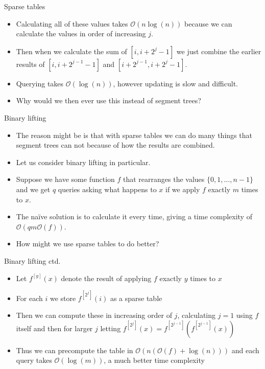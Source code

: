 \documentclass{beamer}
\begin{document}
\begin{frame}[plain]{Sparse tables}
    \begin{itemize}
        \item<1-> Calculating all of these values takes $\mathcal{O}(n\log(n))$ because we can calculate the values in order of increasing $j$.
        \item<2-> Then when we calculate the sum of $[i, i + 2^j - 1]$ we just combine the earlier results of $[i, i + 2^{j-1} - 1]$ and $[i + 2^{j-1}, i + 2^j - 1]$.
        \item<3-> Querying takes $\mathcal{O}(\log(n))$, however updating is slow and difficult.
        \item<4-> Why would we then ever use this instead of segment trees?
    \end{itemize}
\end{frame}

\begin{frame}[plain]{Binary lifting}
    \begin{itemize}
        \item<1-> The reason might be is that with sparse tables we can do many things that segment trees can not because of how the results are combined.
        \item<2-> Let us consider binary lifting in particular.
        \item<3-> Suppose we have some function $f$ that rearranges the values $\{0, 1, \dots, n - 1\}$ and we get $q$ queries asking what happens to $x$ if we apply $f$ exactly $m$ times to $x$.
        \item<4-> The naïve solution is to calculate it every time, giving a time complexity of $\mathcal{O}(qm\mathcal{O}(f))$.
        \item<5-> How might we use sparse tables to do better?
    \end{itemize}
\end{frame}

\begin{frame}[plain]{Binary lifting ctd.}
    \begin{itemize}
        \item<1-> Let $f^{[y]}(x)$ denote the result of applying $f$ exactly $y$ times to $x$
        \item<2-> For each $i$ we store $f^{[2^j]}(i)$ as a sparse table
        \item<3-> Then we can compute these in increasing order of $j$, calculating $j = 1$ using $f$ itself and then for larger $j$ letting $f^{[2^j]}(x) = f^{[2^{j-1}]}(f^{[2^{j-1}]}(x))$
        \item<4-> Thus we can precompute the table in $\mathcal{O}(n(\mathcal{O}(f) + \log(n)))$ and each query takes $\mathcal{O}(\log(m))$, a much better time complexity
    \end{itemize}
\end{frame}
\end{document}
